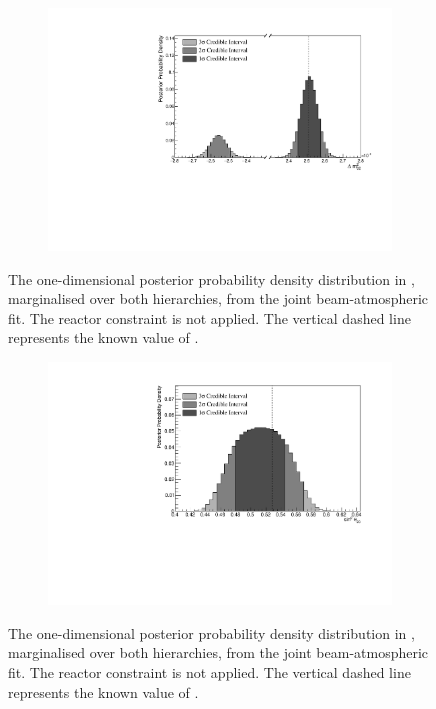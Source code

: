 \begin{figure}[h]
  \begin{subfigure}[t]{0.96\textwidth}
    \includegraphics[width=\textwidth, trim={0mm 0mm 0mm 0mm}, clip,page=1]{Figures/OA/JointFit/Contours_1D_dm32_BH_1_woRC_UnSmeared_CredibleInterval.pdf}
  \end{subfigure}
  \caption{The one-dimensional posterior probability density distribution in , marginalised over both hierarchies, from the joint beam-atmospheric fit. The reactor constraint is not applied. The vertical dashed line represents the known value of .}
  \label{fig:OscillationAnalysis_JointFit_DELM32}
\end{figure}

\begin{figure}[h]
  \begin{subfigure}[t]{0.96\textwidth}
    \includegraphics[width=\textwidth, trim={0mm 0mm 0mm 0mm}, clip,page=1]{Figures/OA/JointFit/Contours_1D_th23_BH_1_woRC_UnSmeared_CredibleInterval.pdf}
  \end{subfigure}
  \caption{The one-dimensional posterior probability density distribution in , marginalised over both hierarchies, from the joint beam-atmospheric fit. The reactor constraint is not applied. The vertical dashed line represents the known value of .}
  \label{fig:OscillationAnalysis_JointFit_TH23}
\end{figure}

